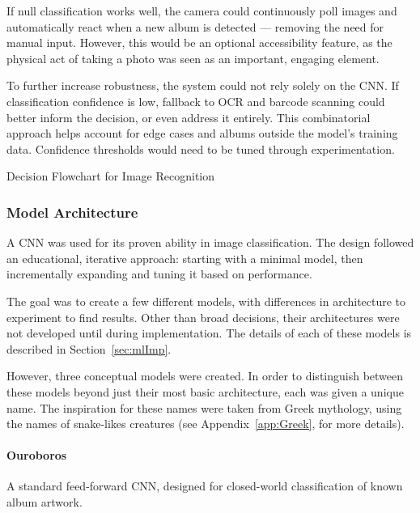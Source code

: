                 If null classification works well, the camera could continuously poll images and automatically react when a new album is detected — removing the need for manual input. However, this would be an optional accessibility feature, as the physical act of taking a photo was seen as an important, engaging element.
    
                To further increase robustness, the system could not rely solely on the CNN. If classification confidence is low, fallback to OCR and barcode scanning could better inform the decision, or even address it entirely. This combinatorial approach helps account for edge cases and albums outside the model's training data. Confidence thresholds would need to be tuned through experimentation.
    
                \begin{temp}
                    Decision Flowchart for Image Recognition
                \end{temp}
        
            \subsubsection{Model Architecture}
    
                A CNN was used for its proven ability in image classification. The design followed an educational, iterative approach: starting with a minimal model, then incrementally expanding and tuning it based on performance.
                
                The goal was to create a few different models, with differences in architecture to experiment to find results. Other than broad decisions, their architectures were not developed until during implementation. The details of each of these models is described in Section~\ref{sec:mlImp}.
    
                However, three conceptual models were created. In order to distinguish between these models beyond just their most basic architecture, each was given a unique name. The inspiration for these names were taken from Greek mythology, using the names of snake-likes creatures (see Appendix~\ref{app:Greek}, for more details).
    
                \paragraph{Ouroboros} A standard feed-forward CNN, designed for closed-world classification of known album artwork.
    
